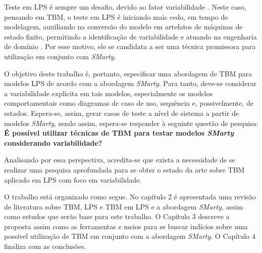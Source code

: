 Teste em LPS é sempre um desafio, devido ao fator variabilidade \cite{chen2009variability,engstrom2011software,chen2011systematic,do2014strategies}. Neste caso, pensando em TBM, o teste em LPS é iniciando mais cedo, em tempo de modelagem, auxiliando na conversão do modelo em artefatos de máquinas de estado finito, permitindo a identificação de variabilidade e atuando na engenharia de domínio \cite{lamancha2010model,reales2011model,lamancha2009automated}. Por esse motivo, ele se candidata a ser uma técnica promissora para utilização em conjunto com \textit{SMarty}. 

O objetivo deste trabalho é, portanto, especificar uma abordagem de TBM para modelos LPS de acordo com a abordagem \textit{SMarty}. Para tanto, deve-se considerar a variabilidade explícita em tais modelos, especialmente os modelos comportamentais como diagramas de caso de uso, sequência e, possivelmente, de estados. Espera-se, assim, gerar casos de teste a nível de sistema a partir de modelos \textit{SMarty}, sendo assim, espera-se responder à seguinte questão de pesquisa: \textbf{É possível utilizar técnicas de TBM para testar modelos \textit{SMarty} considerando variabilidade?}

Analisando por essa perspectiva, acredita-se que exista a necessidade de se realizar uma pesquisa aprofundada para se obter o estado da arte sobre TBM aplicado em LPS com foco em variabilidade. 

O trabalho está organizado como segue. No capítulo 2 é apresentada uma revisão de literatura sobre TBM, LPS e TBM em LPS e a abordagem \textit{SMarty}, assim como estudos que serão base para este trabalho. O Capítulo 3 descreve a proposta assim como as ferramentas e meios para se buscar indícios sobre uma possível utilização de TBM em conjunto com a abordagem \textit{SMarty}. O Capítulo 4 finaliza com as conclusões.


